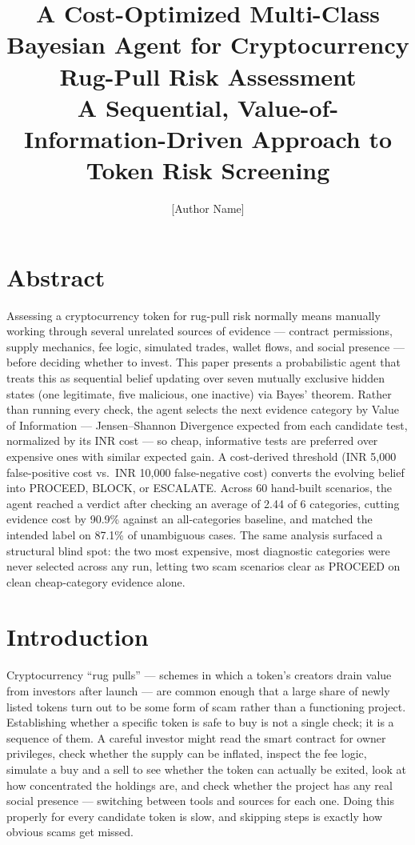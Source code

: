 \documentclass[11pt]{article}
\title{\textbf{A Cost-Optimized Multi-Class Bayesian Agent for Cryptocurrency Rug-Pull Risk Assessment}\\
\large A Sequential, Value-of-Information-Driven Approach to Token Risk Screening}
\author{[Author Name]\\
[Affiliation / Course: AI-Native AI Engineering]}
\date{}
\begin{document}
\maketitle

\section{Abstract}

Assessing a cryptocurrency token for rug-pull risk normally means manually working through several unrelated sources of evidence --- contract permissions, supply mechanics, fee logic, simulated trades, wallet flows, and social presence --- before deciding whether to invest. This paper presents a probabilistic agent that treats this as sequential belief updating over seven mutually exclusive hidden states (one legitimate, five malicious, one inactive) via Bayes' theorem. Rather than running every check, the agent selects the next evidence category by Value of Information --- Jensen--Shannon Divergence expected from each candidate test, normalized by its INR cost --- so cheap, informative tests are preferred over expensive ones with similar expected gain. A cost-derived threshold (INR 5,000 false-positive cost vs.\ INR 10,000 false-negative cost) converts the evolving belief into PROCEED, BLOCK, or ESCALATE. Across 60 hand-built scenarios, the agent reached a verdict after checking an average of 2.44 of 6 categories, cutting evidence cost by 90.9\% against an all-categories baseline, and matched the intended label on 87.1\% of unambiguous cases. The same analysis surfaced a structural blind spot: the two most expensive, most diagnostic categories were never selected across any run, letting two scam scenarios clear as PROCEED on clean cheap-category evidence alone.

\section{Introduction}

Cryptocurrency ``rug pulls'' --- schemes in which a token's creators drain value from investors after launch --- are common enough that a large share of newly listed tokens turn out to be some form of scam rather than a functioning project. Establishing whether a specific token is safe to buy is not a single check; it is a sequence of them. A careful investor might read the smart contract for owner privileges, check whether the supply can be inflated, inspect the fee logic, simulate a buy and a sell to see whether the token can actually be exited, look at how concentrated the holdings are, and check whether the project has any real social presence --- switching between tools and sources for each one. Doing this properly for every candidate token is slow, and skipping steps is exactly how obvious scams get missed.
\end{document}
